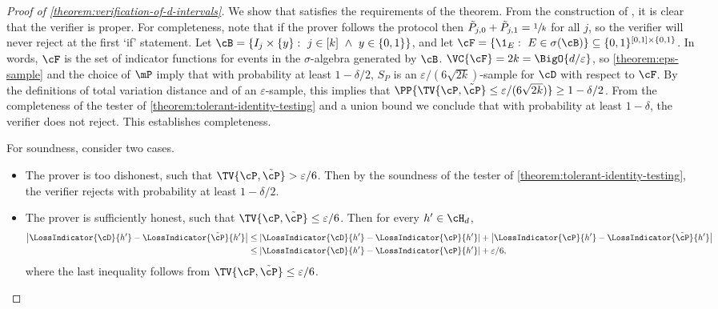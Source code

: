\begin{proof}[Proof of \cref{theorem:verification-of-d-intervals}]
We show that  %
	satisfies the requirements of the theorem. From the construction of , it is clear that the verifier is proper. For completeness, note that if the prover follows the protocol then $\tilde{P}_{j,0} + \tilde{P}_{j,1} = \sfrac{1}{k}$ for all $j$, so the verifier will never reject at the first `if' statement. Let $\cB = \{I_j \times \{y\}: ~ j \in [k] ~ \land ~ y \in \{0,1\}\}$, and let $\cF = \{\1_E: ~ E \in \sigma(\cB)\} \subseteq \{0,1\}^{[0,1]\times \{0,1\}}$. In words, $\cF$ is the set of indicator functions for events in the $\sigma$-algebra generated by $\cB$. $\VC{\cF} = 2k = \BigO{d/\varepsilon}$, so \cref{theorem:eps-sample} and the choice of $\mP$ imply that with probability at least $1-\delta/2$, $S_P$ is an $\varepsilon/(6\sqrt{2k})$-sample for $\cD$ with respect to $\cF$. By the definitions of total variation distance and of an $\varepsilon$-sample, this implies that $\PP{\TV{\cP,\tilde{\cP}} \leq \varepsilon/(6\sqrt{2k})} \geq 1-\delta/2$. From the completeness of the tester of \cref{theorem:tolerant-identity-testing} and a union bound we conclude that with probability at least $1-\delta$, the verifier does not reject. This establishes completeness.

	For soundness, consider two cases. 
	\begin{itemize}
		\item{
			The prover is too dishonest, such that $\TV{\cP,\tilde{\cP}} > \varepsilon/6$. Then by the soundness of the tester of \cref{theorem:tolerant-identity-testing}, the verifier rejects with probability at least $1-\delta/2$.
		} 
		\item{
			The prover is sufficiently honest, such that $\TV{\cP,\tilde{\cP}} \leq \varepsilon/6$. 
			Then for every $h' \in \cH_d$,
			\begin{align}
				\left|\LossIndicator{\cD}{h'} - \LossIndicator{\tilde{\cP}}{h'}\right| &\leq \left|\LossIndicator{\cD}{h'} - \LossIndicator{\cP}{h'}\right| + \left|\LossIndicator{\cP}{h'} - \LossIndicator{\tilde{\cP}}{h'}\right|  \nonumber\\
				&\leq \left|\LossIndicator{\cD}{h'} - \LossIndicator{\cP}{h'}\right| + \varepsilon/6, \label{eq:LD-vs-LPtilde}
			\end{align}
			where the last inequality follows from $\TV{\cP,\tilde{\cP}} \leq \varepsilon/6$.
		
}
\end{itemize}
\end{proof}
